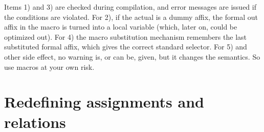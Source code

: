 \documentclass{article}
\newcommand\g[1]{{\sf #1}}
\gdef\mkbold{\catcode`\'\active\def'##1'{\char39\relax{\bt##1}\char39\relax}%
\catcode`\,\active\def,{\char44\relax}%
\catcode`\<\active\def<{\char60\relax}%
\catcode`\>\active\def>{\char62\relax}%
\catcode`\$=12\catcode`\#=12\catcode`\^=12%
\catcode`\ \active\def {\nobreakspace}}}
\newenvironment{program}{%
\ignorespaces
\par\vskip 2pt plus 2pt minus 2pt
\leftmargin=20pt
\parindent=0pt\tt
\catcode`\$=12\catcode`\^=12
\mkbold
\obeylines
\leftskip 8pt
\baselineskip=0.9\baselineskip
\everypar\expandafter{\the\everypar\unpenalty}%
}{\vskip 2pt plus 2pt minus 1pt}
{\catcode`\'=\active\catcode`\ =\active\catcode`\,=\active%
\catcode`\$=12\catcode`\^=12\catcode`\|=\active\catcode`\<\active\catcode`\>\active%
\gdef\pp#1{\relax\begingroup
\catcode`\$=12\catcode`\~=12\catcode`\^=12%
\catcode`\|\active\let|\endgroup
\catcode`\ \active\def {\space}%
\catcode`\'\active\def'##1'{\char39\relax{\bt##1}\char39\relax}%
\catcode`\<\active\def<{\char60\relax}%
\catcode`\>\active\def>{\char62\relax}%
\catcode`\#=12\catcode`\^=12%
\tt
}%
}
\begin{document}
Items 1) and 3) are checked during compilation, and error messages are issued
if the conditions are violated. For 2), if the actual is a \g{dummy affix}, the
formal out affix in the macro is turned into a local variable (which, later
on, could be optimized out). For 4) the macro substitution mechanism remembers the
last substituted formal affix, which gives the correct standard selector.
For 5) and other side effect, no warning is, or can be, given, but it
changes the semantics. So use macros at your own risk.

\section{Redefining assignments and relations}
\end{document}
